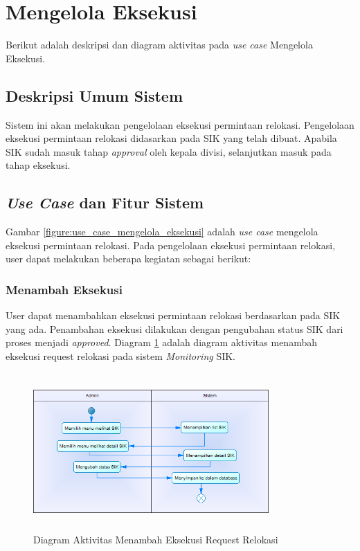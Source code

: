 \section{Mengelola Eksekusi}
Berikut adalah deskripsi dan diagram aktivitas pada \textit{use case} Mengelola Eksekusi.
\subsection{Deskripsi Umum Sistem}
\tab Sistem ini akan melakukan pengelolaan eksekusi permintaan relokasi. Pengelolaan eksekusi permintaan relokasi didasarkan pada SIK yang telah dibuat. Apabila SIK sudah masuk tahap \textit{approval} oleh kepala divisi, selanjutkan masuk pada tahap eksekusi.
\subsection{\textit{Use Case} dan Fitur Sistem}
Gambar \ref{figure:use_case_mengelola_eksekusi} adalah \textit{use case} mengelola eksekusi permintaan relokasi. Pada pengelolaan eksekusi permintaan relokasi, user dapat melakukan beberapa kegiatan sebagai berikut:
	\subsubsection{Menambah Eksekusi}
	User dapat menambahkan eksekusi permintaan relokasi berdasarkan pada SIK yang ada. Penambahan eksekusi dilakukan dengan pengubahan status SIK dari proses menjadi \textit{approved}. Diagram \ref{figure:activity_menambah_eksekusi} adalah diagram aktivitas menambah eksekusi request relokasi pada sistem \textit{Monitoring} SIK.
	\begin{figure}[h]
	\centerline {\includegraphics[width=9cm,height=6cm]{bab4/ActivityDiagram_MenambahkanEksekusi.png}}
	\caption{Diagram Aktivitas Menambah Eksekusi Request Relokasi}
	\label{figure:activity_menambah_eksekusi}
	\end{figure}
		
